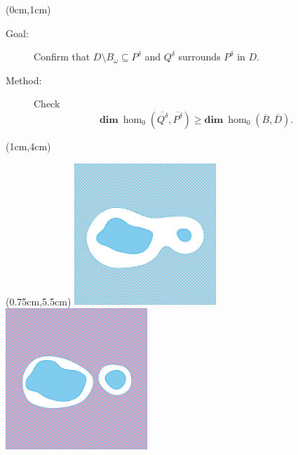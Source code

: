 \begin{frame}
  \begin{textblock*}{12cm}(0cm,1cm)
    \begin{small}
    \begin{description}
      \item[Goal:] {\color{red} Confirm that $D\setminus B_\omega\subseteq P^\delta$ and $Q^\delta$ surrounds $P^\delta$ in $D$.}
      \item[Method:] Check \[\mathbf{dim}~\hom_0(\overline{Q^\delta},\overline{P^\delta})\geq \mathbf{dim}~\hom_0(\overline{B}, \overline{D}).\]
    \end{description}
    \end{small}
  \end{textblock*}

  \begin{textblock*}{11cm}(1cm,4cm)
  \end{textblock*}

  \begin{textblock*}{12cm}(0.75cm,5.5cm)
    \includegraphics[trim=50 250 50 300, clip, width=0.4\textwidth]{figures/comp/DBcomp}\hspace{6ex}%
    \includegraphics[trim=50 250 50 300, clip, width=0.4\textwidth]{figures/comp/PQcomp}
  \end{textblock*}
\end{frame}

